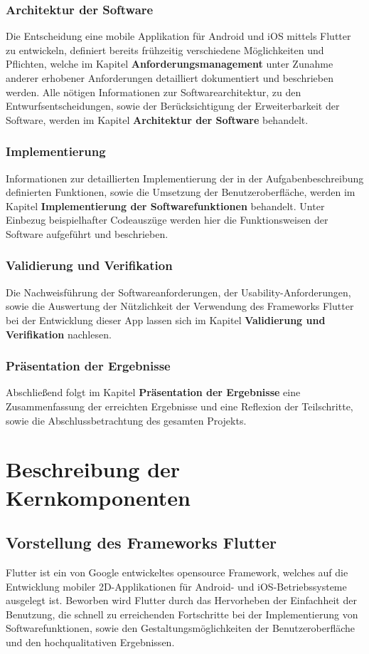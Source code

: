 \documentclass{scrreprt}
\begin{document}
\subsection{Architektur der Software}
Die Entscheidung eine mobile Applikation für Android und iOS mittels Flutter zu entwickeln, definiert bereits frühzeitig verschiedene Möglichkeiten und Pflichten, welche im Kapitel \textbf{Anforderungsmanagement} unter Zunahme anderer erhobener Anforderungen detailliert dokumentiert und beschrieben werden.
Alle nötigen Informationen zur Softwarearchitektur, zu den Entwurfsentscheidungen, sowie der Berücksichtigung der Erweiterbarkeit der Software, werden im Kapitel \textbf{Architektur der Software} behandelt.

\subsection{Implementierung}
Informationen zur detaillierten Implementierung der in der Aufgabenbeschreibung definierten Funktionen, sowie die Umsetzung der Benutzeroberfläche, werden im Kapitel \textbf{Implementierung der Softwarefunktionen} behandelt. Unter Einbezug beispielhafter Codeauszüge werden hier die Funktionsweisen der Software aufgeführt und beschrieben.

\subsection{Validierung und Verifikation}
Die Nachweisführung der Softwareanforderungen, der Usability-Anforderungen, sowie die Auswertung der Nützlichkeit der Verwendung des Frameworks Flutter bei der Entwicklung dieser App lassen sich im Kapitel \textbf{Validierung und Verifikation} nachlesen.

\subsection{Präsentation der Ergebnisse}
Abschließend folgt im Kapitel \textbf{Präsentation der Ergebnisse} eine Zusammenfassung der erreichten Ergebnisse und eine Reflexion der Teilschritte, sowie die Abschlussbetrachtung des gesamten Projekts.


\chapter{Beschreibung der Kernkomponenten}

\section{Vorstellung des Frameworks Flutter}
Flutter ist ein von Google entwickeltes opensource Framework, welches auf die Entwicklung mobiler 2D-Applikationen für Android- und iOS-Betriebssysteme ausgelegt ist. Beworben wird Flutter durch das Hervorheben der Einfachheit der Benutzung, die schnell zu erreichenden Fortschritte bei der Implementierung von Softwarefunktionen, sowie den Gestaltungsmöglichkeiten der Benutzeroberfläche und den hochqualitativen Ergebnissen.
\end{document}
